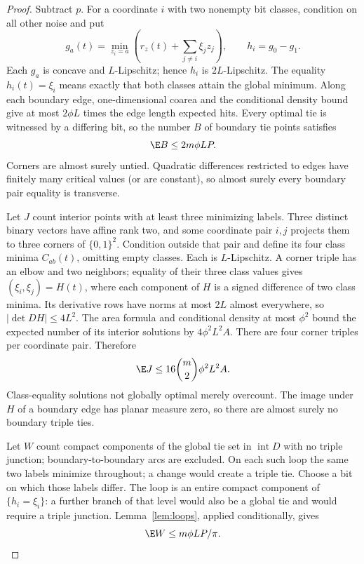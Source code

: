 \begin{proof}
Subtract $p$. For a coordinate $i$ with two nonempty bit classes, condition
on all other noise and put
\[
 g_a(t)=\min_{z_i=a}\left(r_z(t)+\sum_{j\ne i}\xi_jz_j\right),
 \qquad h_i=g_0-g_1.
\]
Each $g_a$ is concave and $L$-Lipschitz; hence $h_i$ is $2L$-Lipschitz.
The equality $h_i(t)=\xi_i$ means exactly that both classes attain the
global minimum. Along each boundary edge, one-dimensional coarea and the
conditional density bound give at most $2\phi L$ times the edge length
expected hits. Every optimal tie is witnessed by a differing bit, so the
number $B$ of boundary tie points satisfies
\begin{equation}\label{eq:planarB}
 \E B\le2m\phi LP.
\end{equation}
Corners are almost surely untied. Quadratic differences restricted to edges
have finitely many critical values (or are constant), so almost surely
every boundary pair equality is transverse.

Let $J$ count interior points with at least three minimizing labels.
Three distinct binary vectors have affine rank two, and some coordinate
pair $i,j$ projects them to three corners of $\{0,1\}^2$. Condition
outside that pair and define its four class minima $C_{ab}(t)$, omitting
empty classes. Each is $L$-Lipschitz. A corner triple has an elbow and two
neighbors; equality of their three class values gives
$(\xi_i,\xi_j)=H(t)$, where each component of $H$ is a signed difference
of two class minima. Its derivative rows have norms at most $2L$ almost
everywhere, so $|\det DH|\le4L^2$. The area formula and conditional density
at most $\phi^2$ bound the expected number of its interior solutions by
$4\phi^2L^2A$. There are four corner triples per coordinate pair. Therefore
\begin{equation}\label{eq:planarJ}
 \E J\le16\binom{m}{2}\phi^2L^2A.
\end{equation}
Class-equality solutions not globally optimal merely overcount. The image
under $H$ of a boundary edge has planar measure zero, so there are almost
surely no boundary triple ties.

Let $W$ count compact components of the global tie set in
$\operatorname{int}D$ with no triple junction; boundary-to-boundary arcs
are excluded. On each such loop the same two labels minimize throughout;
a change would create a triple tie. Choose a bit on which those labels
differ. The loop is an entire compact component of $\{h_i=\xi_i\}$:
a further branch of that level would also be a global tie and would require
a triple junction. Lemma~\ref{lem:loops}, applied conditionally, gives
\begin{equation}\label{eq:planarW}
 \E W\le m\phi LP/\pi.
\end{equation}


\end{proof}
